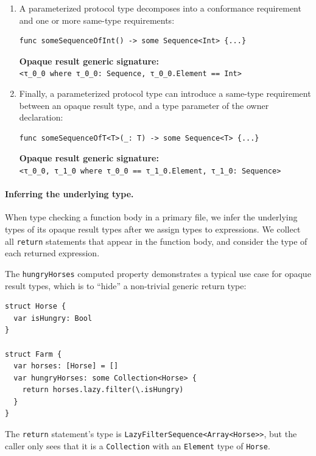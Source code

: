 \documentclass[../generics]{subfiles}
\begin{document}
\begin{example}
\begin{enumerate}
\item A parameterized protocol type decomposes into a conformance requirement and one or more same-type requirements:
\begin{Verbatim}
func someSequenceOfInt() -> some Sequence<Int> {...}
\end{Verbatim}
\textbf{Opaque result generic signature:}\\ \verb|<τ_0_0 where τ_0_0: Sequence, τ_0_0.Element == Int>|

\item Finally, a parameterized protocol type can introduce a same-type requirement between an opaque result type, and a type parameter of the owner declaration:
\begin{Verbatim}
func someSequenceOfT<T>(_: T) -> some Sequence<T> {...}
\end{Verbatim}
\textbf{Opaque result generic signature:}\\ \verb|<τ_0_0, τ_1_0 where τ_0_0 == τ_1_0.Element, τ_1_0: Sequence>|
\end{enumerate}
\end{example}

\paragraph{Inferring the underlying type.}
When type checking a function body in a primary file, we infer the underlying types of its opaque result types after we assign types to expressions. We collect all \texttt{return} statements that appear in the function body, and consider the type of each returned expression.

\begin{example}
The \texttt{hungryHorses} computed property demonstrates a typical use case for opaque result types, which is to ``hide'' a non-trivial generic return type:
\begin{Verbatim}
struct Horse {
  var isHungry: Bool
}

struct Farm {
  var horses: [Horse] = []
  var hungryHorses: some Collection<Horse> {
    return horses.lazy.filter(\.isHungry)
  }
}
\end{Verbatim}
The \texttt{return} statement's type is \texttt{LazyFilterSequence<Array<Horse>>}, but the caller only sees that it is a \texttt{Collection} with an \texttt{Element} type of \texttt{Horse}.
\end{example}
\end{document}
